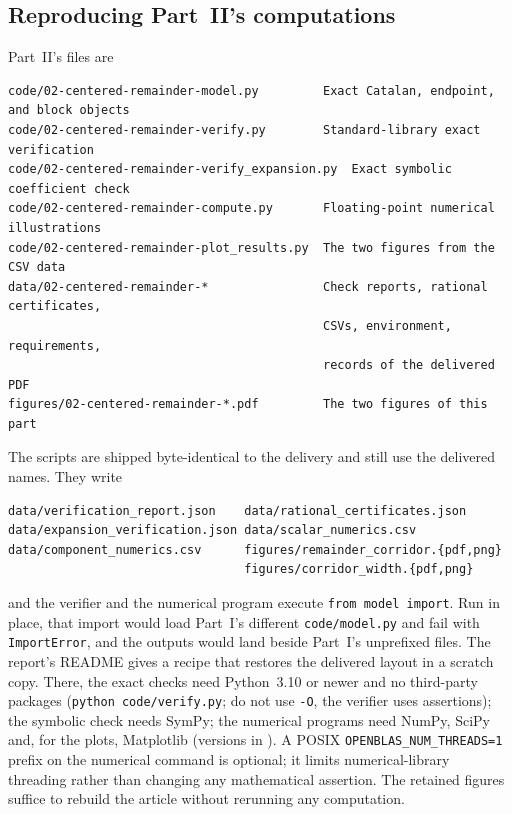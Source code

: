 \documentclass[11pt,a4paper]{article}
\theoremstyle{definition}\newaliascnt{definition}{theorem}
\theoremstyle{remark}\newaliascnt{remark}{theorem}
\begin{document}
\subsection{Reproducing Part~II's computations}
\label{crem:sec:reproduce}
Part~II's files are
\begin{lstlisting}
code/02-centered-remainder-model.py         Exact Catalan, endpoint, and block objects
code/02-centered-remainder-verify.py        Standard-library exact verification
code/02-centered-remainder-verify_expansion.py  Exact symbolic coefficient check
code/02-centered-remainder-compute.py       Floating-point numerical illustrations
code/02-centered-remainder-plot_results.py  The two figures from the CSV data
data/02-centered-remainder-*                Check reports, rational certificates,
                                            CSVs, environment, requirements,
                                            records of the delivered PDF
figures/02-centered-remainder-*.pdf         The two figures of this part
\end{lstlisting}
The scripts are shipped byte-identical to the delivery and still use the
delivered names. They write
\begin{lstlisting}
data/verification_report.json    data/rational_certificates.json
data/expansion_verification.json data/scalar_numerics.csv
data/component_numerics.csv      figures/remainder_corridor.{pdf,png}
                                 figures/corridor_width.{pdf,png}
\end{lstlisting}
and the verifier and the numerical program execute
\texttt{from model import}. Run in place, that import would load Part~I's
different \texttt{code/model.py} and fail with \texttt{ImportError}, and the
outputs would land beside Part~I's unprefixed files. The report's README gives a
recipe that restores the delivered layout in a scratch copy. There, the exact
checks need Python~3.10 or newer and no third-party packages
(\texttt{python code/verify.py}; do not use \texttt{-O}, the verifier uses
assertions); the symbolic check needs SymPy; the numerical programs need
NumPy, SciPy and, for the plots, Matplotlib (versions in
). A POSIX
\texttt{OPENBLAS\_NUM\_THREADS=1} prefix on the numerical command is optional;
it limits numerical-library threading rather than changing any mathematical
assertion. The retained figures suffice to rebuild the article without
rerunning any computation.
\end{document}
